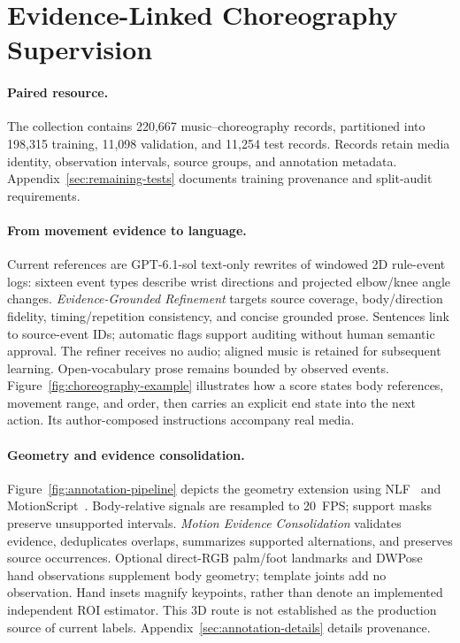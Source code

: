 \section{Evidence-Linked Choreography Supervision}
\label{sec:data}


\paragraph{Paired resource.}
The collection contains 220,667 music--choreography records, partitioned
into 198,315 training, 11,098 validation, and 11,254 test records.
Records retain media identity, observation intervals, source groups,
and annotation metadata. Appendix~\ref{sec:remaining-tests} documents
training provenance and split-audit requirements.

\paragraph{From movement evidence to language.}
Current references are GPT-6.1-sol text-only rewrites of windowed 2D
rule-event logs: sixteen event types describe wrist directions and
projected elbow/knee angle changes. \emph{Evidence-Grounded Refinement}
targets source coverage, body/direction fidelity, timing/repetition
consistency, and concise grounded prose. Sentences link to source-event
IDs; automatic flags support auditing without human semantic approval.
The refiner receives no audio; aligned music is retained for subsequent
learning. Open-vocabulary prose remains bounded by observed events.
Figure~\ref{fig:choreography-example} illustrates how a score states body
references, movement range, and order, then carries an explicit end state
into the next action. Its author-composed instructions accompany real media.


\paragraph{Geometry and evidence consolidation.}
Figure~\ref{fig:annotation-pipeline} depicts the geometry extension using
NLF~\cite{nlf} and MotionScript~\cite{motionscript}. Body-relative signals
are resampled to 20~FPS; support masks preserve unsupported intervals.
\emph{Motion Evidence Consolidation} validates evidence, deduplicates
overlaps, summarizes supported alternations, and preserves source
occurrences. Optional direct-RGB palm/foot landmarks and DWPose hand
observations supplement body geometry; template joints add no observation.
Hand insets magnify keypoints, rather than denote an implemented
independent ROI estimator. This 3D route is not established as the
production source of current labels. Appendix~\ref{sec:annotation-details}
details provenance.

